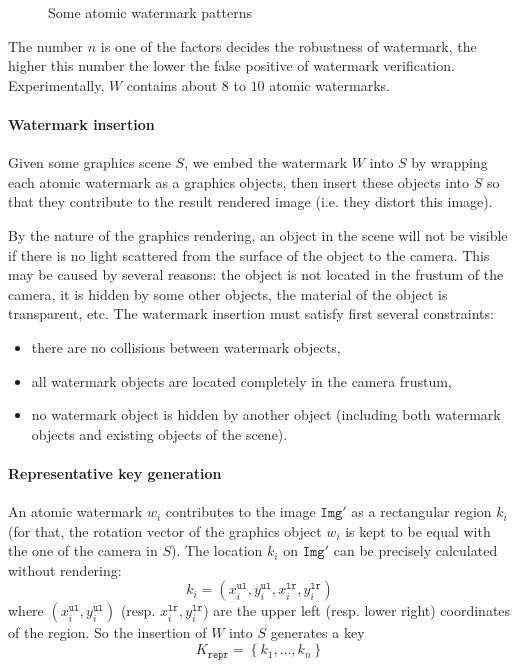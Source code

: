 \documentclass[a4paper,11pt,onecolumn]{memoir}
\begin{document}
\begin{figure}[h]
\begin{subfigure}[b]{0.25\textwidth}
    \end{subfigure}
    \caption[Some atomic watermark patterns]{Some atomic watermark patterns}
    \label{fig:atomic_patterns}
\end{figure}
The number $n$ is one of the factors decides the robustness of watermark, the higher this number the lower the false positive of watermark verification. Experimentally, $W$ contains about $8$ to $10$ atomic watermarks.

\paragraph[Watermark insertion]{Watermark insertion}
Given some graphics scene $S$, we embed the watermark $W$ into $S$ by wrapping each atomic watermark as a graphics objects, then insert these objects into $S$ so that they contribute to the result rendered image (i.e. they distort this image).

By the nature of the graphics rendering, an object in the scene will not be visible if there is no light scattered from the surface of the object to the camera. This may be caused by several reasons: the object is not located in the frustum of the camera, it is hidden by some other objects, the material of the object is transparent, etc. The watermark insertion must satisfy first several constraints:
\begin{itemize}
    \item there are no collisions between watermark objects,
    \item all watermark objects are located completely in the camera frustum,
    \item no watermark object is hidden by another object (including both watermark objects and existing objects of the scene).
\end{itemize}

\paragraph[Representative key generation]{Representative key generation}
An atomic watermark $w_i$ contributes to the image $\mathtt{Img'}$ as a rectangular region $k_i$ (for that, the rotation vector of the graphics object $w_i$ is kept to be equal with the one of the camera in $S$). The location $k_i$ on $\mathtt{Img'}$ can be precisely calculated without rendering:
\begin{equation*}
    k_i = \left(x^{\mathtt{ul}}_i, y^{\mathtt{ul}}_{i},x^{\mathtt{lr}}_i, y^{\mathtt{lr}}_{i}\right)
\end{equation*}
where $\left(x^{\mathtt{ul}}_i, y^{\mathtt{ul}}_{i}\right)$ (resp. $x^{\mathtt{lr}}_i, y^{\mathtt{lr}}_{i}$) are the upper left (resp. lower right) coordinates of the region. So the insertion of $W$ into $S$ generates a key
\begin{equation*}
    K_{\mathtt{repr}} = \left\{k_1,\dots,k_n \right\}
\end{equation*}
\end{document}
